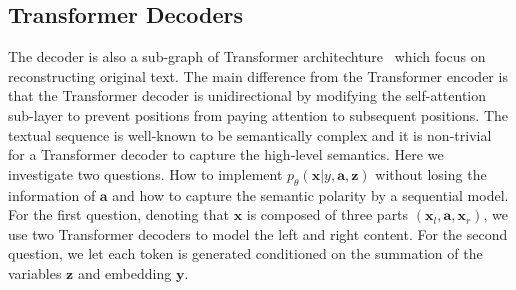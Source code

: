 \documentclass[11pt,a4paper]{article}
\begin{document}
\subsection{Transformer Decoders}
The decoder is also a sub-graph of Transformer architechture~\cite{DBLP:conf/nips/VaswaniSPUJGKP17} which focus on reconstructing original text. The main difference from the Transformer encoder is that the Transformer decoder is unidirectional by modifying the self-attention sub-layer to prevent positions from paying attention to subsequent positions. The textual sequence is well-known to be semantically complex and it is non-trivial for a Transformer decoder to capture the high-level semantics.
Here we investigate two questions.
How to implement $p_\theta(\mathbf{x}| y,\mathbf{a}, \mathbf{z})$ without losing the information of $\mathbf{a}$ and how to capture the semantic polarity by a sequential model. For the first question, denoting that $\mathbf{x}$ is composed of three parts $(\mathbf{x}_l, \mathbf{a}, \mathbf{x}_r)$, we use two Transformer decoders to model the left and right content.
For the second question, we let each token is generated conditioned on the summation of the variables $\mathbf{z}$ and embedding $\mathbf{y}$.
\end{document}
